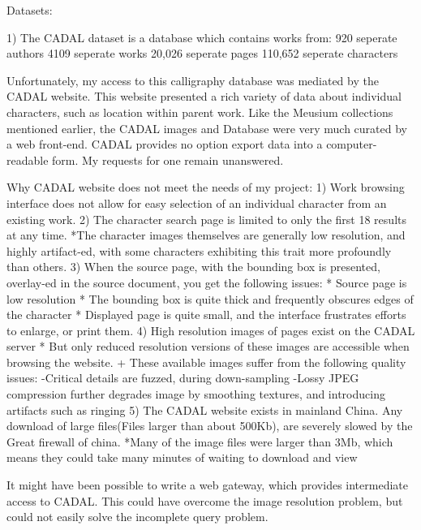 Datasets:

1)  The CADAL dataset is a database which contains works from:
    920 seperate authors
    4109 seperate works
    20,026 seperate pages
    110,652 seperate characters


Unfortunately, my access to this calligraphy database was mediated by the CADAL website.  This website presented a rich variety of data about individual characters, such as location within parent work.  Like the Meusium collections mentioned earlier, the CADAL images and Database were very much curated by a web front-end.  CADAL provides no option export data into a computer-readable form.  My requests for one remain unanswered.

    Why CADAL website does not meet the needs of my project:
        1)  Work browsing interface does not allow for easy selection of an individual character from an existing work.
        2)  The character search page is limited to only the first 18 results at any time.
            *The character images themselves are generally low resolution, and highly artifact-ed, with some characters exhibiting this trait more profoundly than others.
        3)  When the source page, with the bounding box is presented, overlay-ed in the source document, you get the following issues:
            *  Source page is low resolution
            *  The bounding box is quite thick and frequently obscures edges of the character
            *  Displayed page is quite small, and the interface frustrates efforts to enlarge, or print them.
        4)  High resolution images of pages exist on the CADAL server
            * But only reduced resolution versions of these images are accessible when browsing the website.
                + These available images suffer from the following quality issues:
                    -Critical details are fuzzed, during down-sampling
                    -Lossy JPEG compression further degrades image by smoothing textures, and introducing artifacts such as ringing
        5)  The CADAL website exists in mainland China.  Any download of large files(Files larger than about 500Kb), are severely slowed by the Great firewall of china.
            *Many of the image files were larger than 3Mb, which means they could take many minutes of waiting to download and view
        
        
    It might have been possible to write a web gateway, which provides intermediate access to CADAL.  This could have overcome the image resolution problem, but could not easily solve the incomplete query problem.
    
